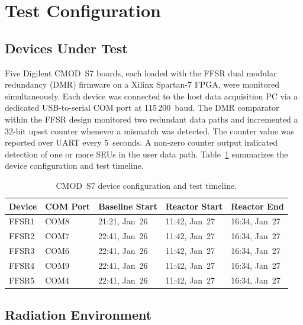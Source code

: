 \section{Test Configuration}
\label{sec:ch6_test}

\subsection{Devices Under Test}
\label{subsec:ch6_dut}

Five Digilent CMOD~S7 boards, each loaded with the FFSR dual modular
redundancy (DMR) firmware on a Xilinx Spartan-7 FPGA, were monitored
simultaneously.  Each device was connected to the host data acquisition
PC via a dedicated USB-to-serial COM port at 115\,200~baud.  The DMR
comparator within the FFSR design monitored two redundant data paths and
incremented a 32-bit upset counter whenever a mismatch was detected.
The counter value was reported over UART every 5~seconds.  A non-zero
counter output indicated detection of one or more SEUs in the user data
path.  Table~\ref{tab:ch6_devices} summarizes the device configuration
and test timeline.

\begin{table}[htbp]
    \centering
    \caption{CMOD~S7 device configuration and test timeline.}
    \label{tab:ch6_devices}
    \begin{tabular}{lllll}
        \toprule
        \textbf{Device} & \textbf{COM Port} & \textbf{Baseline Start}
            & \textbf{Reactor Start} & \textbf{Reactor End} \\
        \midrule
        FFSR1 & COM8 & 21:21, Jan~26 & 11:42, Jan~27 & 16:34, Jan~27 \\
        FFSR2 & COM7 & 22:41, Jan~26 & 11:42, Jan~27 & 16:34, Jan~27 \\
        FFSR3 & COM6 & 22:41, Jan~26 & 11:42, Jan~27 & 16:34, Jan~27 \\
        FFSR4 & COM9 & 22:41, Jan~26 & 11:42, Jan~27 & 16:34, Jan~27 \\
        FFSR5 & COM4 & 22:41, Jan~26 & 11:42, Jan~27 & 16:34, Jan~27 \\
        \bottomrule
    \end{tabular}
\end{table}

\subsection{Radiation Environment}
\label{subsec:ch6_radiation}

